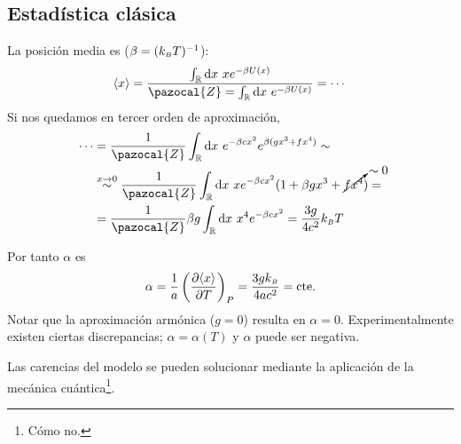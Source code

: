 \subsection{Estadística clásica}
La posición media es ($\beta = (k_{\scriptscriptstyle{B}}  T)^{-1}$):
\begin{equation}
  \langle x \rangle = \frac{\int_\mathbb{R} \text{d}x\  x e^{-\beta
  U(x)}}{ \pazocal{Z} = \int_\mathbb{R} \text{d}x\  e^{-\beta U(x)}} = \cdots
\end{equation}
Si nos quedamos en tercer orden de aproximación,
\begin{equation}
\begin{split}
  \cdots &= \frac{1}{\pazocal{Z}}  \int_\mathbb{R} \text{d}x \ e^{-\beta c x^2}
    e^{\beta(gx^3 + fx^4)} \sim \\ &\stackrel{x \to 0}{\sim}
    \frac{1}{\pazocal{Z}} \int_\mathbb{R} \text{d}x \ x e^{-\beta c
      x^2} (1 + \beta g x^3 + \cancelto{\sim 0}{f x^4}) = \\
         &= \frac{1}{\pazocal{Z}} \beta g\int_\mathbb{R} \text{d}x  \ x^4
           e^{-\beta c x^2} = \frac{3g}{4c^2 } \kb  T
\end{split}
\end{equation}

Por tanto $\alpha$ es
\begin{equation}
  \alpha = \frac{1}{a} \left( \frac{\partial \langle x
      \rangle}{\partial T} \right)_P =  \frac{3gk_{\scriptscriptstyle{B}} }{4ac^2} = \text{cte.}
\end{equation}
Notar que la aproximación armónica ($g = 0$) resulta en $\alpha =
0$.
Experimentalmente existen ciertas discrepancias; $\alpha =
\alpha(T)$ y
 $\alpha$ puede ser negativa.

Las carencias del modelo se pueden solucionar mediante la aplicación
de la mecánica cuántica\footnote{Cómo no.}.

